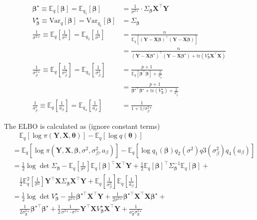 \documentclass[12pt]{article}
\begin{document}
\begin{align*}
	\bm{\beta}^\star \equiv \mathbb{E}_{q}[\bm{\beta}] = \mathbb{E}_{q_1}[\bm{\beta}] &= \frac{1}{\sigma^{2 \star }} \cdot \Sigma_{\bm{\beta}}  \bm{X}^\top \bm{Y}\\
	V_{\bm{\beta}}^\star \equiv  \text{Var}_q[\bm{\beta}] = \text{Var}_{q_1}[\bm{\beta}] &= \Sigma_{\bm{\beta}}\\
	\frac{1}{\sigma^{2\star}}\equiv  \mathbb{E}_{q}\left[\frac{1}{\sigma^2} \right] = \mathbb{E}_{q_2}\left[\frac{1}{\sigma^2} \right] &= \frac{n}{\mathbb{E}_q\left[(\bm{Y} - \bm{X}\bm{\beta})^{\top} (\bm{Y} - \bm{X}\bm{\beta})\right]} \\
	&= \frac{n}{(\bm{Y} - \bm{X}\bm{\beta}^\star)^{\top} (\bm{Y} - \bm{X}\bm{\beta}^\star) + \text{tr}(V_{\bm{\beta}}^{\star} \bm{X}^\top \bm{X})} \\
	\frac{1}{\sigma_{\beta}^{2\star}} \equiv \mathbb{E}_{q}\left[\frac{1}{\sigma_{\beta}^2} \right] = \mathbb{E}_{q_3}\left[\frac{1}{\sigma_{\beta}^2} \right]&=\frac{p+1}{\mathbb{E}_q[\bm{\beta}^\top \bm{\beta}] + \frac{2}{a_\beta^\star}}\\
	&= \frac{p+1}{\bm{\beta}^{\star \top} \bm{\beta}^\star + \text{tr}(V_{\bm{\beta}}^\star) + \frac{2}{a_\beta^\star}}\\
	\frac{1}{a_{\beta}^\star} \equiv \mathbb{E}_q\left[ \frac{1}{a_{\beta}} \right] = \mathbb{E}_{q_4}\left[ \frac{1}{a_{\beta}} \right] &= \frac{1}{1+1/\sigma_{\beta}^{2\star}}
\end{align*}

The ELBO is calculated as (ignore constant terms)
\begin{align*}
	&\quad \mathbb{E}_q[\log \pi (\bm{Y}, \bm{X}, \bm{\theta})] - \mathbb{E}_q[\log q(\bm{\theta})]\\
	&=\mathbb{E}_q[\log \pi (\bm{Y}, \bm{X}, \bm{\beta}, \sigma^2, \sigma_{\beta}^2, a_{\beta})] - \mathbb{E}_q[\log q_1(\bm{\beta})q_2(\sigma^2)q3(\sigma_{\beta}^2)q_4(a_{\beta})]\\
	&=\frac{1}{2} \log \det \Sigma_{\bm{\beta}} -\mathbb{E}_q\left[\frac{1}{\sigma^2} \right]\mathbb{E}_q[\bm{\beta}]^\top \bm{X}^\top \bm{Y} + \frac{1}{2}\mathbb{E}_q[\bm{\beta}]^\top \Sigma_{\bm{\beta}}^{-1} \mathbb{E}_q[\bm{\beta}]+\\
	&\quad \frac{1}{2} \mathbb{E}_q^{2}\left[\frac{1}{\sigma^2} \right] \bm{Y}^\top \bm{X} \Sigma_{\bm{\beta}} \bm{X}^\top \bm{Y} + \mathbb{E}_q\left[\frac{1}{\sigma_\beta^2}\right] \mathbb{E}_q\left[\frac{1}{a_\beta}\right] \\
	& = \frac{1}{2}\log \det V_{\bm{\beta}}^{\star} - \frac{1}{\sigma^{2\star}}\bm{\beta}^{\star \top} \bm{X}^\top \bm{Y} + \frac{1}{2\sigma^{2\star}} \bm{\beta}^{\star \top} \bm{X}^\top \bm{X} \bm{\beta}^{\star} +\\
	&\quad \frac{1}{2\sigma_{\bm{\beta}}^{2\star}}\bm{\beta}^{\star \top} \bm{\beta}^{\star} + \frac{1}{2}\frac{1}{\sigma^{2\star}\cdot \sigma^{2\star}}\bm{Y}^{\top} \bm{X} V_{\bm{\beta}}^{\star} \bm{X}^{\top} \bm{Y} + \frac{1}{a_{\bm{\beta}}^{\star} \sigma_{\bm{\beta}}^{2 \star}}	
\end{align*}
\end{document}
